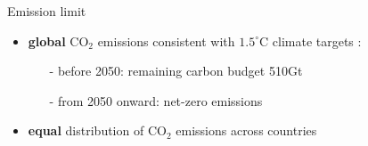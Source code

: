 \documentclass[11pt,aspectratio=169]{beamer}
\begin{document}

\begin{frame}{Emission limit}
	\hypertarget{altems}{}
	\vspace{-1mm}
	\begin{itemize}
		\item  \textbf{global} CO$_2$ emissions consistent with $1.5^\circ$C climate targets \footnotesize{\citep{IPCC2022}}\normalsize :
		\vspace{1mm}
		\begin{itemize}
			\item[-] before 2050: remaining carbon budget 510Gt
			\item[-] from 2050 onward: net-zero  emissions
		\end{itemize}
		\vspace{0mm}
		\item \normalsize{\textbf{equal} distribution of  CO$_2$ emissions across countries }
	\end{itemize}
	\vspace{-2mm}
	

\end{frame}
\end{document}
